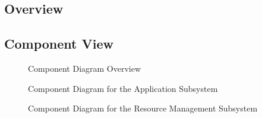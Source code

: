 \documentclass[english]{article}
\begin{document}
\subsection{Overview}

\subsection{Component View}

\begin{figure}[H]
	\centering
	\caption{Component Diagram Overview}
	\label{componentdiagram1}
\end{figure}
\begin{figure}[H]
	\centering
	\caption{Component Diagram for the Application Subsystem}
	\label{componentdiagram2}
\end{figure}
\begin{figure}[H]
	\centering
	\caption{Component Diagram for the Resource Management Subsystem}
	\label{componentdiagram3}
\end{figure}
\end{document}
